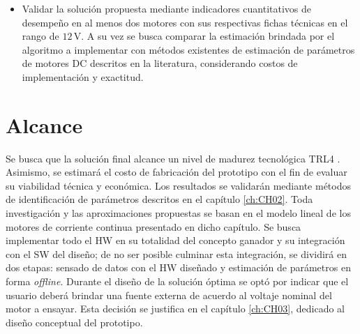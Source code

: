 \begin{itemize}
            \item Validar la solución propuesta mediante indicadores cuantitativos de desempeño en al menos dos motores con sus respectivas fichas técnicas en el rango de $12$\,V. A su vez se busca comparar la estimación brindada por el algoritmo a implementar con métodos existentes de estimación de parámetros de motores \ac{DC} descritos en la literatura, considerando costos de implementación y exactitud. 
        \end{itemize}
            
    \section{Alcance}
    \label{sec:Alcance}
        \noindent
        Se busca que la solución final alcance un nivel de madurez tecnológica TRL4 \autocite{trl}. Asimismo, se estimará el costo de fabricación del prototipo con el fin de evaluar su viabilidad técnica y económica. Los resultados se validarán mediante métodos de identificación de parámetros descritos en el capítulo \ref{ch:CH02}. Toda investigación y las aproximaciones propuestas se basan en el modelo lineal de los motores de corriente continua presentado en dicho capítulo. Se busca implementar todo el \ac{HW} en su totalidad del concepto ganador y su integración con el \ac{SW} del diseño; de no ser posible culminar esta integración, se dividirá en dos etapas: sensado de datos con el \ac{HW} diseñado y  estimación de parámetros en forma \textit{offline}. Durante el diseño de la solución óptima se optó por indicar que el usuario deberá brindar una fuente externa de acuerdo al voltaje nominal del motor a ensayar. Esta decisión se justifica en el capítulo \ref{ch:CH03}, dedicado al diseño conceptual del prototipo.
    

